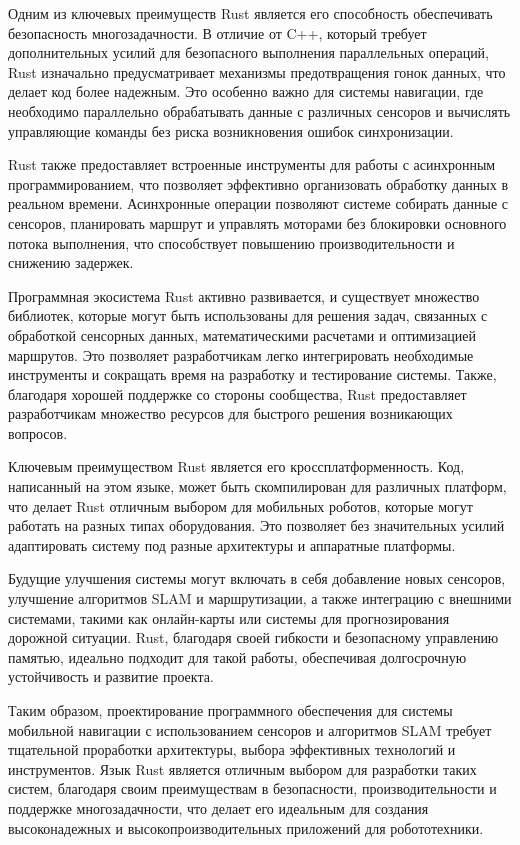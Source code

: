 Одним из ключевых преимуществ Rust является его способность обеспечивать
безопасность многозадачности. В отличие от C++, который требует дополнительных
усилий для безопасного выполнения параллельных операций, Rust изначально
предусматривает механизмы предотвращения гонок данных, что делает код более
надежным. Это особенно важно для системы навигации, где необходимо параллельно
обрабатывать данные с различных сенсоров и вычислять управляющие команды без
риска возникновения ошибок синхронизации.

Rust также предоставляет встроенные инструменты для работы с асинхронным
программированием, что позволяет эффективно организовать обработку данных в
реальном времени. Асинхронные операции позволяют системе собирать данные с
сенсоров, планировать маршрут и управлять моторами без блокировки основного
потока выполнения, что способствует повышению производительности и снижению
задержек.

Программная экосистема Rust активно развивается, и существует множество
библиотек, которые могут быть использованы для решения задач, связанных с
обработкой сенсорных данных, математическими расчетами и оптимизацией маршрутов.
Это позволяет разработчикам легко интегрировать необходимые инструменты и
сокращать время на разработку и тестирование системы. Также, благодаря хорошей
поддержке со стороны сообщества, Rust предоставляет разработчикам множество
ресурсов для быстрого решения возникающих вопросов.

Ключевым преимуществом Rust является его кроссплатформенность. Код, написанный
на этом языке, может быть скомпилирован для различных платформ, что делает Rust
отличным выбором для мобильных роботов, которые могут работать на разных типах
оборудования. Это позволяет без значительных усилий адаптировать систему под
разные архитектуры и аппаратные платформы.

Будущие улучшения системы могут включать в себя добавление новых сенсоров,
улучшение алгоритмов SLAM и маршрутизации, а также интеграцию с внешними
системами, такими как онлайн-карты или системы для прогнозирования дорожной
ситуации. Rust, благодаря своей гибкости и безопасному управлению памятью,
идеально подходит для такой работы, обеспечивая долгосрочную устойчивость и
развитие проекта.

Таким образом, проектирование программного обеспечения для системы мобильной
навигации с использованием сенсоров и алгоритмов SLAM требует тщательной
проработки архитектуры, выбора эффективных технологий и инструментов. Язык Rust
является отличным выбором для разработки таких систем, благодаря своим
преимуществам в безопасности, производительности и поддержке многозадачности,
что делает его идеальным для создания высоконадежных и высокопроизводительных
приложений для робототехники.

